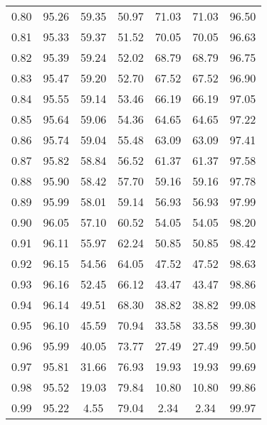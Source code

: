 \begin{tabular}{|c|c|c|c|c|c|c|}
      0.80 &     95.26 &     59.35 &      50.97 &   71.03 &      71.03 &         96.50 \\
      0.81 &     95.33 &     59.37 &      51.52 &   70.05 &      70.05 &         96.63 \\
      0.82 &     95.39 &     59.24 &      52.02 &   68.79 &      68.79 &         96.75 \\
      0.83 &     95.47 &     59.20 &      52.70 &   67.52 &      67.52 &         96.90 \\
      0.84 &     95.55 &     59.14 &      53.46 &   66.19 &      66.19 &         97.05 \\
      0.85 &     95.64 &     59.06 &      54.36 &   64.65 &      64.65 &         97.22 \\
      0.86 &     95.74 &     59.04 &      55.48 &   63.09 &      63.09 &         97.41 \\
      0.87 &     95.82 &     58.84 &      56.52 &   61.37 &      61.37 &         97.58 \\
      0.88 &     95.90 &     58.42 &      57.70 &   59.16 &      59.16 &         97.78 \\
      0.89 &     95.99 &     58.01 &      59.14 &   56.93 &      56.93 &         97.99 \\
      0.90 &     96.05 &     57.10 &      60.52 &   54.05 &      54.05 &         98.20 \\
      0.91 &     96.11 &     55.97 &      62.24 &   50.85 &      50.85 &         98.42 \\
      0.92 &     96.15 &     54.56 &      64.05 &   47.52 &      47.52 &         98.63 \\
      0.93 &     96.16 &     52.45 &      66.12 &   43.47 &      43.47 &         98.86 \\
      0.94 &     96.14 &     49.51 &      68.30 &   38.82 &      38.82 &         99.08 \\
      0.95 &     96.10 &     45.59 &      70.94 &   33.58 &      33.58 &         99.30 \\
      0.96 &     95.99 &     40.05 &      73.77 &   27.49 &      27.49 &         99.50 \\
      0.97 &     95.81 &     31.66 &      76.93 &   19.93 &      19.93 &         99.69 \\
      0.98 &     95.52 &     19.03 &      79.84 &   10.80 &      10.80 &         99.86 \\
      0.99 &     95.22 &      4.55 &      79.04 &    2.34 &       2.34 &         99.97 \\
\bottomrule
\end{tabular}
